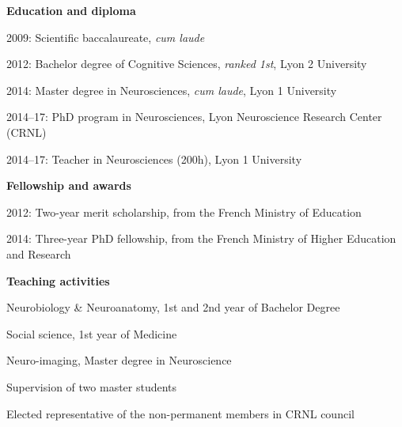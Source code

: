 \label{sec:cv}
\vspace*{-10mm}

\textbf{Education and diploma}

2009: Scientific baccalaureate, \textit{cum laude}

2012: Bachelor degree of Cognitive Sciences, \textit{ranked 1st}, Lyon 2 University

2014: Master degree in Neurosciences, \textit{cum laude}, Lyon 1 University

2014–17: PhD program in Neurosciences, Lyon Neuroscience Research Center (CRNL)

2014–17: Teacher in Neurosciences (200h), Lyon 1 University

\textbf{Fellowship and awards}

2012: Two-year merit scholarship, from the French Ministry of Education

2014: Three-year PhD fellowship, from the French Ministry of Higher Education and Research

\textbf{Teaching activities}

Neurobiology \& Neuroanatomy, 1st and 2nd year of Bachelor Degree

Social science, 1st year of Medicine

Neuro-imaging, Master degree in Neuroscience

Supervision of two master students

Elected representative of the non-permanent members in CRNL council
